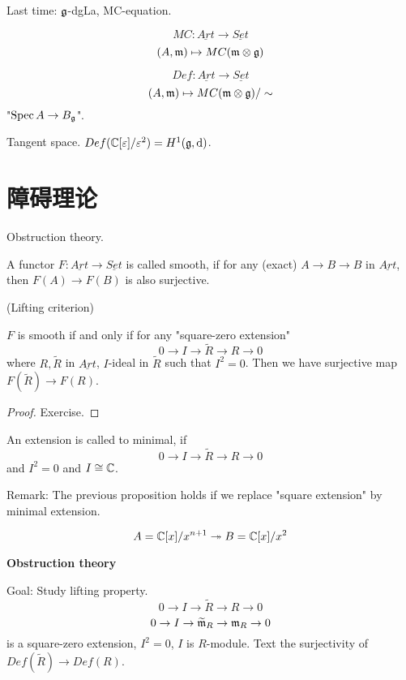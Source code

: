 
Last time: $\mathfrak{g}$-dgLa, MC-equation.

$$MC:\underline{Art}\to\underline{Set}$$
$$(A,\mathfrak{m})\mapsto MC(\mathfrak{m}\otimes\mathfrak{g})$$

$$Def:\underline{Art}\to\underline{Set}$$
$$(A,\mathfrak{m})\mapsto MC(\mathfrak{m}\otimes\mathfrak{g})/\sim$$
"$\operatorname{Spec} A\to B_{\mathfrak{g}}$".

Tangent space.  $Def(\mathbb{C}[\varepsilon]/\varepsilon^2)=H^1(\mathfrak{g},\mathrm{d})$.

\section{障碍理论}
Obstruction theory.

\begin{definition}
A functor $F:\underline{Art}\to\underline{Set}$ is called smooth,
if for any (exact) $A\to B\to B$ in $\underline{Art}$,
then $F(A)\to F(B)$ is also surjective.
\end{definition}
(Lifting criterion)

\begin{prop}
$F$ is smooth if and only if for any "square-zero extension"
$$0\to I\to \widetilde{R}\to R\to 0$$
where $R,\widetilde{R}$ in $\underline{Art}$, 
$I$-ideal in $\widetilde{R}$ such that $I^2=0$.
Then we have surjective map $F(\widetilde{R})\to F(R)$.
\end{prop}

\begin{proof}
Exercise.
\end{proof}

\begin{definition}
An extension is called to minimal, if 
$$0\to I\to \widetilde{R}\to R\to 0$$
and $I^2=0$ and $I\cong \mathbb{C}$.
\end{definition}

Remark: The previous proposition holds if
we replace "square extension" by minimal extension.

\begin{example}
$$A=\mathbb{C}[x]/x^{n+1}\twoheadrightarrow B=\mathbb{C}[x]/x^2$$
\end{example} 

\textbf{Obstruction theory}

Goal: Study lifting property.
$$0\to I\to\widetilde{R}\to R\to 0$$
$$0\to I\to\widetilde{\mathfrak{m}}_R\to \mathfrak{m}_R\to 0$$
is a square-zero extension, $I^2=0$, $I$ is $R$-module. 
Text the surjectivity of 
$Def(\widetilde{R})\to Def(R)$.

